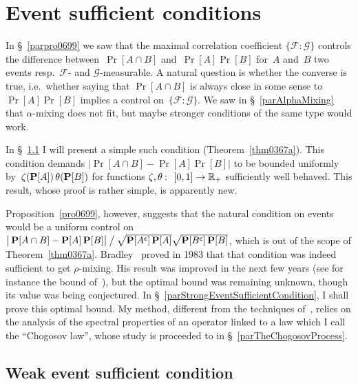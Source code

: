 \chapter{Event sufficient conditions}\label{parEventSufficientConditions}%

In \S~\ref{parpro0699} we saw that the maximal correlation coefficient $\{\mathcal{F}:\mathcal{G}\}$
controls the difference between~$\Pr[A \cap B]$ and~$\Pr[A]\Pr[B]$
for~$A$ and~$B$ two events resp.\ $\mathcal{F}$- and $\mathcal{G}$-measurable.
A natural question is whether the converse is true,
i.e.\ whether saying that $\Pr[A\cap B]$ is always close in some sense to~$\Pr[A]\Pr[B]$
implies a control on~$\{\mathcal{F}:\mathcal{G}\}$.
We saw in \S~\ref{parAlphaMixing} that $\alpha$-mixing does not fit,
but maybe stronger conditions of the same type would work.

In \S~\ref{parWeakEventSufficientCondition}
I will present a simple such condition (Theorem~\ref{thm0367a}).
This condition demands $|\Pr[A\cap B]-\Pr[A]\Pr[B]|$ to be bounded uniformly
by~$\zeta(\Pr[A])\*\,\theta(\Pr[B])$ for functions $\zeta,\theta \colon [0,1] \to \RR_+$
sufficiently well behaved.
This result, whose proof is rather simple, is apparently new.

Proposition~\ref{pro0699}, however, suggests that the natural condition on events
would be a uniform control on
$\big|\Pr[A\cap B]-\Pr[A]\Pr[B]\big| \mathbin{\big/} \sqrt{\Pr[\C{A}]\Pr[A]}\sqrt{\Pr[\C{B}]\Pr[B]}$,
which is out of the scope of Theorem~\ref{thm0367a}.
Bradley~\cite{Bradley83} proved in 1983 that
that condition was indeed sufficient to get $\rho$-mixing.
His result was improved in the next few years
(see for instance the bound of~\cite{Bulinskii84}),
but the optimal bound was remaining unknown,
though its value was being conjectured.
In \S~\ref{parStrongEventSufficientCondition}, I shall prove this optimal bound.
My method, different from the techniques of~\cite{Bradley83, Bulinskii84},
relies on the analysis of the spectral properties of an operator linked to a law
which I call the ``Chogosov law'', whose study is proceeded to in \S~\ref{parTheChogosovProcess}.


\section{Weak event sufficient condition}\label{parWeakEventSufficientCondition}

